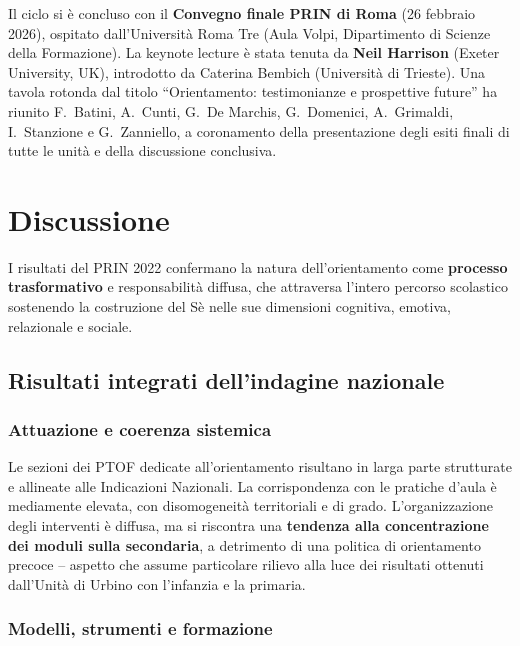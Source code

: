\documentclass[12pt,a4paper]{article}
\begin{document}
Il ciclo si \`e concluso con il \textbf{Convegno finale PRIN di Roma} (26 febbraio 2026), ospitato dall'Universit\`a Roma Tre (Aula Volpi, Dipartimento di Scienze della Formazione). La keynote lecture \`e stata tenuta da \textbf{Neil Harrison} (Exeter University, UK), introdotto da Caterina Bembich (Universit\`a di Trieste). Una tavola rotonda dal titolo ``Orientamento: testimonianze e prospettive future'' ha riunito F.~Batini, A.~Cunti, G.~De Marchis, G.~Domenici, A.~Grimaldi, I.~Stanzione e G.~Zanniello, a coronamento della presentazione degli esiti finali di tutte le unit\`a e della discussione conclusiva.


\section{Discussione}

I risultati del PRIN 2022 confermano la natura dell'orientamento come \textbf{processo trasformativo} e responsabilit\`a diffusa, che attraversa l'intero percorso scolastico sostenendo la costruzione del S\`e nelle sue dimensioni cognitiva, emotiva, relazionale e sociale.

\subsection{Risultati integrati dell'indagine nazionale}

\subsubsection{Attuazione e coerenza sistemica}

Le sezioni dei PTOF dedicate all'orientamento risultano in larga parte strutturate e allineate alle Indicazioni Nazionali. La corrispondenza con le pratiche d'aula \`e mediamente elevata, con disomogeneit\`a territoriali e di grado. L'organizzazione degli interventi \`e diffusa, ma si riscontra una \textbf{tendenza alla concentrazione dei moduli sulla secondaria}, a detrimento di una politica di orientamento precoce -- aspetto che assume particolare rilievo alla luce dei risultati ottenuti dall'Unit\`a di Urbino con l'infanzia e la primaria.

\subsubsection{Modelli, strumenti e formazione}
\end{document}
